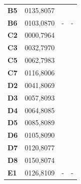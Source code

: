\documentclass{article}
\begin{document}
\begin{CJK*}{UTF8}{bkai}
\begin{multicols}{2}
\begin{tabular}{|l|c|c|l|}
	\textbf{B5}&0135,8057& &\\
	\textbf{B6}&0103,0870&-&-\\
	\hline
	\textbf{C2}&0000,7964& &\\
	\textbf{C3}&0032,7970& &\\
	\textbf{C5}&0062,7983& &\\
	\textbf{C7}&0116,8006& &\\
	\hline
	\textbf{D2}&0041,8069& &\\
	\textbf{D3}&0057,8093& &\\
	\textbf{D4}&0064,8085& &\\
	\textbf{D5}&0085,8089& &\\
	\textbf{D6}&0105,8090& &\\
	\textbf{D7}&0120,8077& &\\
	\textbf{D8}&0150,8074& &\\
	\hline
	\textbf{E1}&0126,8109&-&-\\
	\hline
\end{tabular}
\end{multicols}
\end{CJK*}
\end{document}
